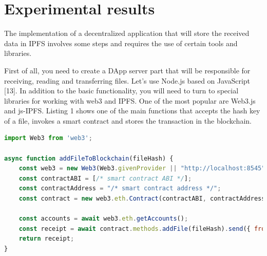 \documentclass[10pt,conference,a4paper]{IEEEtran_EDM}
\begin{document}
\section{Experimental results}
The implementation of a decentralized application that will store the received data in IPFS involves some steps and requires the use of certain tools and libraries. 

First of all, you need to create a DApp server part that will be responsible for receiving, reading and transferring files. Let's use Node.js based on JavaScript [13]. In addition to the basic functionality, you will need to turn to special libraries for working with web3 and IPFS. One of the most popular are Web3.js and js-IPFS. Listing 1 shows one of the main functions that accepts the hash key of a file, invokes a smart contract and stores the transaction in the blockchain.





\lstset{style=mystyle}


\begin{lstlisting}[language=JavaScript, caption=JavaScript code implementing saving to the blockchain]
import Web3 from 'web3';

async function addFileToBlockchain(fileHash) {
    const web3 = new Web3(Web3.givenProvider || "http://localhost:8545");
    const contractABI = [/* smart contract ABI */];
    const contractAddress = "/* smart contract address */";
    const contract = new web3.eth.Contract(contractABI, contractAddress);

    const accounts = await web3.eth.getAccounts();
    const receipt = await contract.methods.addFile(fileHash).send({ from: accounts[0] });
    return receipt;
}
\end{lstlisting}
\end{document}
